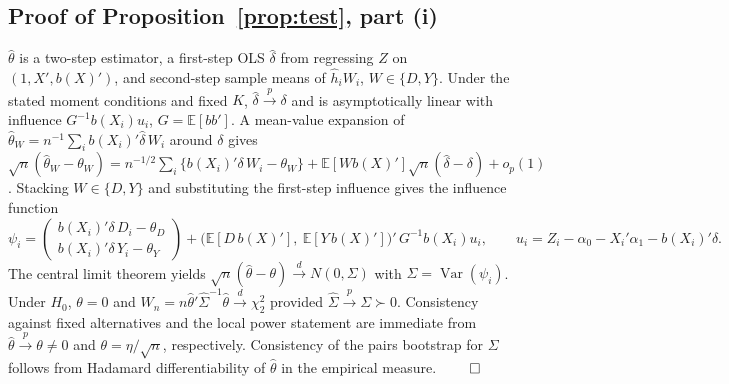 \documentclass[preprint,11pt,authoryear]{elsarticle}
\theoremstyle{definition}
\newcommand{\E}{\mathbb{E}}
\newcommand{\Var}{\operatorname{Var}}
\newcommand{\convd}{\overset{d}{\longrightarrow}}
\newcommand{\convp}{\overset{p}{\longrightarrow}}
\begin{document}
\subsection*{Proof of Proposition~\ref{prop:test}, part (i)}
$\hat\theta$ is a two-step estimator, a first-step OLS $\hat\delta$ from
regressing $Z$ on $(1,X',b(X)')$, and second-step sample means of $\hat h_i W_i$,
$W\in\{D,Y\}$. Under the stated moment conditions and fixed $K$,
$\hat\delta\convp\delta$ and is asymptotically linear with influence
$G^{-1}b(X_i)u_i$, $G=\E[bb']$. A mean-value expansion of
$\hat\theta_W=n^{-1}\sum_i b(X_i)'\hat\delta\,W_i$ around $\delta$ gives
$\sqrt n(\hat\theta_W-\theta_W)=n^{-1/2}\sum_i\{b(X_i)'\delta\,W_i-\theta_W\}
+\E[W b(X)']\sqrt n(\hat\delta-\delta)+o_p(1)$. Stacking $W\in\{D,Y\}$ and substituting
the first-step influence gives the influence function
\[
\psi_i=\begin{pmatrix} b(X_i)'\delta\,D_i-\theta_D\\ b(X_i)'\delta\,Y_i-\theta_Y\end{pmatrix}
+\Big(\E[D\,b(X)'],\ \E[Y\,b(X)']\Big)'\,G^{-1}b(X_i)u_i,
\qquad u_i=Z_i-\alpha_0-X_i'\alpha_1-b(X_i)'\delta.
\]
The central limit theorem yields
$\sqrt n(\hat\theta-\theta)\convd N(0,\Sigma)$ with
$\Sigma=\Var(\psi_i)$. Under $H_0$, $\theta=0$ and $W_n=n\hat\theta'\hat\Sigma^{-1}
\hat\theta\convd\chi^2_2$ provided $\hat\Sigma\convp\Sigma\succ0$. Consistency
against fixed alternatives and the local power statement are immediate from
$\hat\theta\convp\theta\neq0$ and $\theta=\eta/\sqrt n$, respectively.
Consistency of the pairs bootstrap for $\Sigma$ follows from Hadamard
differentiability of $\hat\theta$ in the empirical measure. \hfill$\qed$
\end{document}
